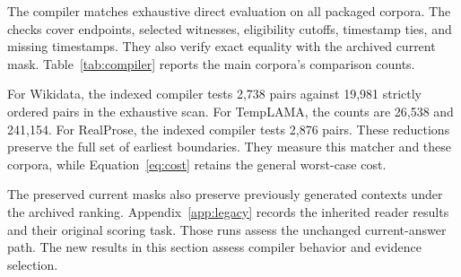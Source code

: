 The compiler matches exhaustive direct evaluation on all packaged corpora.
The checks cover endpoints, selected witnesses, eligibility cutoffs, timestamp ties, and missing timestamps.
They also verify exact equality with the archived current mask.
Table~\ref{tab:compiler} reports the main corpora's comparison counts.


For Wikidata, the indexed compiler tests 2,738 pairs against 19,981 strictly ordered pairs in the exhaustive scan.
For TempLAMA, the counts are 26,538 and 241,154.
For RealProse, the indexed compiler tests 2,876 pairs.
These reductions preserve the full set of earliest boundaries.
They measure this matcher and these corpora, while Equation~\ref{eq:cost} retains the general worst-case cost.

The preserved current masks also preserve previously generated contexts under the archived ranking.
Appendix~\ref{app:legacy} records the inherited reader results and their original scoring task.
Those runs assess the unchanged current-answer path.
The new results in this section assess compiler behavior and evidence selection.
